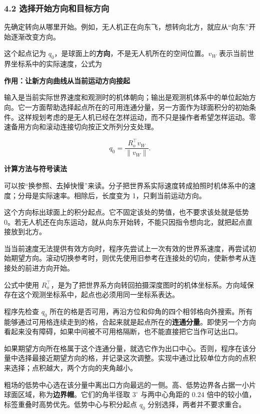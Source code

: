 \documentclass[12pt,a4paper]{article}
\numberwithin{equation}{topic}
\begin{document}
\subsubsection*{4.2 选择开始方向和目标方向}

先确定转向从哪里开始。例如，无人机正在向东飞，想转向北方，就应从“向东”开始逐渐改变方向。

这个起点记为 \(q_0\)，是球面上的\textbf{方向}，不是无人机所在的空间位置。\(v_W\) 表示当前世界坐标系中的实际速度，公式为

\noindent\textbf{作用：让新方向曲线从当前运动方向接起}\par\nobreak
输入是当前实际世界速度和观测时的机体朝向；输出是观测机体系中的单位起始方向。它一方面帮助选择起点所在的可用连通分量，另一方面作为球面积分的初始条件。这样规划考虑的是无人机已经在怎样运动，而不只是操作者希望怎样运动。零速备用方向和滚动连接切向按正文所列分支处理。

\begin{equation}
\label{eq:start}
q_0=\frac{R_o^\top v_W}{\|v_W\|}.
\end{equation}

\noindent\textbf{计算方法与符号读法}\par\nobreak
可以按“换参照、去掉快慢”来读。分子把世界系实际速度转成拍照时机体系中的速度；分母是实际速率。相除后，长度变为 1，只剩当前运动方向。

这个方向标出球面上的积分起点。它不固定该处的势值，也不要求该处就是低势 0。若无人机还在向东运动，就从向东开始转，不能只因指令想向北，就把起点直接放到北方。


当当前速度无法提供有效方向时，程序先尝试上一次有效的世界系速度，再尝试初始期望方向。滚动切换参考时，则优先使用旧参考在连接处的切向，使新参考从连接处的前进方向开始。

公式中使用 \(R_o^\top\)，是为了把世界系方向转回拍摄深度图时的机体坐标系。方向域保存在这个观测坐标系中，起点也必须用同一坐标系表达。

程序先检查 \(q_0\) 所在的格是否可用，再沿方位和仰角的四个相邻格向外搜索。所有能够通过可用格连续走到的格，合起来就是起点所在的\textbf{连通分量}。即使另一个方向看起来没有障碍，如果中间被不可用格隔断，也不能直接把它当作可达出口。

如果期望方向所在格属于这个连通分量，就选它作为出口中心。否则，程序在该分量中选择最接近期望方向的格，并记录这次调整。实现中通过比较单位方向的点积来选择；点积越大，两个方向的夹角越小。

粗场的低势中心选在该分量中离出口方向最远的一侧。高、低势边界各占据一小片球面区域，称为\textbf{边界帽}。它们的角半径取 \(3^\circ\) 与两中心角距的 \(0.24\) 倍中的较小值，标签重叠时高势优先。低势中心与积分起点 \(q_0\) 分别选择，两者并不要求重合。
\end{document}
